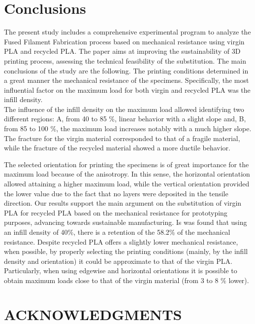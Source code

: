 \documentclass[conference,final,]{IEEEtran}
\begin{document}
\hypertarget{conclusions}{%
\section{Conclusions}\label{conclusions}}

The present study includes a comprehensive experimental program to
analyze the Fused Filament Fabrication process based on mechanical
resistance using virgin PLA and recycled PLA. The paper aims at
improving the sustainability of 3D printing process, assessing the
technical feasibility of the substitution. The main conclusions of the
study are the following. The printing conditions determined in a great
manner the mechanical resistance of the specimens. Specifically, the
most influential factor on the maximum load for both virgin and recycled
PLA was the infill density.\\
The influence of the infill density on the maximum load allowed
identifying two different regions: A, from 40 to 85 \%, linear behavior
with a slight slope and, B, from 85 to 100 \%, the maximum load
increases notably with a much higher slope. The fracture for the virgin
material corresponded to that of a fragile material, while the fracture
of the recycled material showed a more ductile behavior.

The selected orientation for printing the specimens is of great
importance for the maximum load because of the anisotropy. In this
sense, the horizontal orientation allowed attaining a higher maximum
load, while the vertical orientation provided the lower value due to the
fact that no layers were deposited in the tensile direction. Our results
support the main argument on the substitution of virgin PLA for recycled
PLA based on the mechanical resistance for prototyping purposes,
advancing towards sustainable manufacturing. Is was found that using an
infill density of 40\%, there is a retention of the 58.2\% of the
mechanical resistance. Despite recycled PLA offers a slightly lower
mechanical resistance, when possible, by properly selecting the printing
conditions (mainly, by the infill density and orientation) it could be
approximate to that of the virgin PLA. Particularly, when using edgewise
and horizontal orientations it is possible to obtain maximum loads close
to that of the virgin material (from 3 to 8 \% lower).

\hypertarget{acknowledgments}{%
\section{ACKNOWLEDGMENTS}\label{acknowledgments}}
\end{document}
